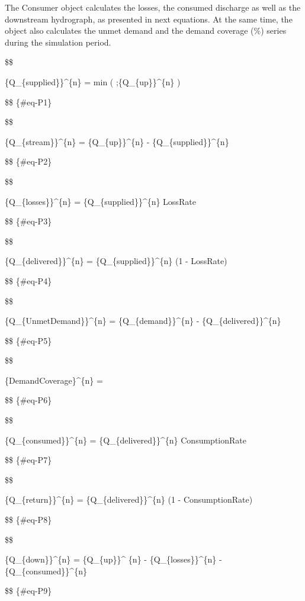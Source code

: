 \documentclass[
  letterpaper,
  DIV=11,
  numbers=noendperiod]{scrreprt}
\begin{document}
The Consumer object calculates the losses, the consumed discharge as
well as the downstream hydrograph, as presented in next equations. At
the same time, the object also calculates the unmet demand and the
demand coverage (\%) series during the simulation period.

\$\$

\{Q\_\{supplied\}\}\^{}\{n\} = min \bigg(
;\{Q\_\{up\}\}\^{}\{n\} \bigg)

\$\$ \{\#eq-P1\}

\$\$

\{Q\_\{stream\}\}\^{}\{n\} = \{Q\_\{up\}\}\^{}\{n\} -
\{Q\_\{supplied\}\}\^{}\{n\}

\$\$ \{\#eq-P2\}

\$\$

\{Q\_\{losses\}\}\^{}\{n\} = \{Q\_\{supplied\}\}\^{}\{n\} \cdot LossRate

\$\$ \{\#eq-P3\}

\$\$

\{Q\_\{delivered\}\}\^{}\{n\} = \{Q\_\{supplied\}\}\^{}\{n\} \cdot (1 -
LossRate)

\$\$ \{\#eq-P4\}

\$\$

\{Q\_\{UnmetDemand\}\}\^{}\{n\} = \{Q\_\{demand\}\}\^{}\{n\} -
\{Q\_\{delivered\}\}\^{}\{n\}

\$\$ \{\#eq-P5\}

\$\$

\{DemandCoverage\}\^{}\{n\} =

\$\$ \{\#eq-P6\}

\$\$

\{Q\_\{consumed\}\}\^{}\{n\} = \{Q\_\{delivered\}\}\^{}\{n\}
\cdot ConsumptionRate

\$\$ \{\#eq-P7\}

\$\$

\{Q\_\{return\}\}\^{}\{n\} = \{Q\_\{delivered\}\}\^{}\{n\} \cdot (1 -
ConsumptionRate)

\$\$ \{\#eq-P8\}

\$\$

\{Q\_\{down\}\}\^{}\{n\} = \{Q\_\{up\}\}\^{} \{n\} -
\{Q\_\{losses\}\}\^{}\{n\} - \{Q\_\{consumed\}\}\^{}\{n\}

\$\$ \{\#eq-P9\}
\end{document}

